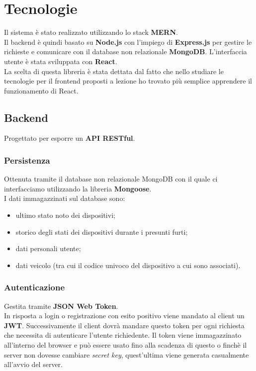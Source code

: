\documentclass{report}
\begin{document}
\section{Tecnologie}
Il sistema è stato realizzato utilizzando lo stack \textbf{MERN}.\\
Il backend è quindi basato su \textbf{Node.js} con l'impiego di \textbf{Express.js} per gestire le richieste e comunicare con il database non relazionale \textbf{MongoDB}. L'interfaccia utente è stata sviluppata con \textbf{React}.\\
La scelta di questa libreria è stata dettata dal fatto che nello studiare le tecnologie per il frontend proposti a lezione ho trovato più semplice apprendere il funzionamento di React.

\subsection{Backend}
Progettato per esporre un \textbf{API RESTful}.
\subsubsection{Persistenza}
Ottenuta tramite il database non relazionale MongoDB con il quale ci interfacciamo utilizzando la libreria \textbf{Mongoose}.\\
I dati immagazzinati sul database sono:
\begin{itemize}
    \item ultimo stato noto dei dispositivi;
    \item storico degli stati dei dispositivi durante i presunti furti;
    \item dati personali utente;
    \item dati veicolo (tra cui il codice univoco del dispositivo a cui sono associati).
\end{itemize}

\subsubsection{Autenticazione}
Gestita tramite \textbf{JSON Web Token}.\\
In risposta a login o registrazione con esito positivo viene mandato al client un \textbf{JWT}. Successivamente il client dovrà mandare questo token per ogni richiesta che necessita di autenticare l'utente richiedente. Il token viene immagazzinato all'interno del browser e può essere usato fino alla scadenza di questo o finchè il server non dovesse cambiare \textit{secret key}, quest'ultima viene generata casualmente all'avvio del server.
\end{document}
